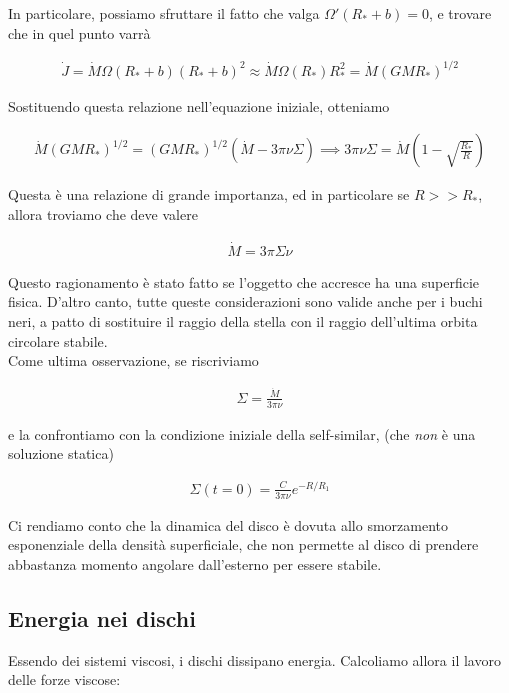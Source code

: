 \documentclass{report}
\begin{document}
In particolare, possiamo sfruttare il fatto che valga \(\Omega'(R_* + b) = 0\), e trovare che in quel punto varrà 

\begin{align}
    \dot{J} = \dot{M}\Omega(R_* + b)(R_* + b)^2 \approx \dot{M}\Omega(R_*)R_*^2 = \dot{M}(GMR_*)^{1/2}
\end{align}


Sostituendo questa relazione nell'equazione iniziale, otteniamo 

\begin{align}
    \dot{M}(GM R_*)^{1/2} = (GM R_*)^{1/2}(\dot{M} - 3\pi \nu \Sigma) \implies 3\pi \nu \Sigma = \dot{M}\left( 1 - \sqrt{\frac{R_*}{R}} \right)
\end{align}

Questa è una relazione di grande importanza, ed in particolare se \(R >> R_*\), allora troviamo che deve valere 

\begin{align}
    \dot{M} = 3\pi \Sigma \nu
\end{align}

Questo ragionamento è stato fatto se l'oggetto che accresce ha una superficie fisica. D'altro canto, tutte queste considerazioni sono valide anche per i buchi neri, a patto di sostituire il raggio della stella con il raggio dell'ultima orbita circolare stabile. \\

Come ultima osservazione, se riscriviamo 

\begin{align}
    \Sigma = \frac{\dot{M}}{3\pi \nu}
\end{align}

e la confrontiamo con la condizione iniziale della self-similar, (che \emph{non} è una soluzione statica)

\begin{align}
    \Sigma(t=0) = \frac{C}{3\pi \nu}e^{-R/R_1}
\end{align}

Ci rendiamo conto che la dinamica del disco è dovuta allo smorzamento esponenziale della densità superficiale, che non permette al disco di prendere abbastanza momento angolare dall'esterno per essere stabile. 

\subsection{Energia nei dischi}

Essendo dei sistemi viscosi, i dischi dissipano energia. Calcoliamo allora il lavoro delle forze viscose: 
\end{document}
